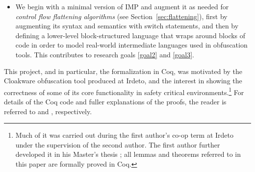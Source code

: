 \documentclass[compsoc,conference,a4paper,10pt,times]{IEEEtran}
\begin{document}
\begin{itemize}
   \item We begin with a minimal version of IMP and augment it as needed for \emph{control flow flattening algorithms} (see Section~\ref{sec:flattening}),
   first by augmenting its syntax and semantics with switch statements, and then by defining a lower-level block-structured language that wraps around blocks of code in order to model real-world intermediate languages used in obfuscation tools. This contributes to research goals \ref{goal2} and \ref{goal3}. \label{itm:3}
\end{itemize}

This project, and in particular, the formalization in Coq, was motivated by the Cloakware obfuscation tool produced at Irdeto, and the interest in showing the correctness of some of its core functionality in safety critical environments.\footnote{Much of it was carried out during the first author's co-op term at Irdeto under the supervision of the second author. The first author further developed it in his Master's thesis \cite{Weiyun}; all lemmas and theorems referred to in this paper are formally proved in Coq.} For details of the Coq code and fuller explanations of the proofs, the reader is referred to \cite{WeiRepo} and \cite{Weiyun}, respectively.


\end{document}
